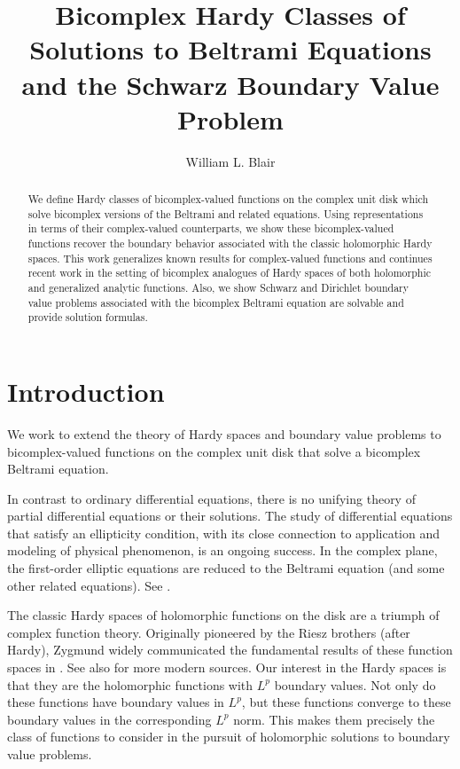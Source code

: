 \documentclass[12pt,reqno]{amsart}
\title{Bicomplex Hardy Classes of Solutions to Beltrami Equations and the Schwarz Boundary Value Problem}
\author{William L. Blair}
\theoremstyle{definition}
\theoremstyle{remark}
\begin{document}
\begin{abstract}
    We define Hardy classes of bicomplex-valued functions on the complex unit disk which solve bicomplex versions of the Beltrami and related equations. Using representations in terms of their complex-valued counterparts, we show these bicomplex-valued functions recover the boundary behavior associated with the classic holomorphic Hardy spaces. This work generalizes known results for complex-valued functions and continues recent work in the setting of bicomplex analogues of Hardy spaces of both holomorphic and generalized analytic functions. Also, we show Schwarz and Dirichlet boundary value problems associated with the bicomplex Beltrami equation are solvable and provide solution formulas.
\end{abstract}

\maketitle

\section{Introduction}

We work to extend the theory of Hardy spaces and boundary value problems to bicomplex-valued functions on the complex unit disk that solve a bicomplex Beltrami equation. 










    In contrast to ordinary differential equations, there is no unifying theory of partial differential equations or their solutions. The study of differential equations that satisfy an ellipticity condition, with its close connection to application and modeling of physical phenomenon, is an ongoing success. In the complex plane, the first-order elliptic equations are reduced to the Beltrami equation (and some other related equations). See \cite{Bo, Vek}. 




    The classic Hardy spaces of holomorphic functions on the disk are a triumph of complex function theory. Originally pioneered by the Riesz brothers (after Hardy), Zygmund widely communicated the fundamental results of these function spaces in \cite{Zygmund}. See also \cite{Duren, Koosis, BAF, RudinCR, Rep, Pavlovic} for more modern sources. Our interest in the Hardy spaces is that they are the holomorphic functions with $L^p$ boundary values. Not only do these functions have boundary values in $L^p$, but these functions converge to these boundary values in the corresponding $L^p$ norm. This makes them precisely the class of functions to consider in the pursuit of holomorphic solutions to boundary value problems.
    
\end{document}

